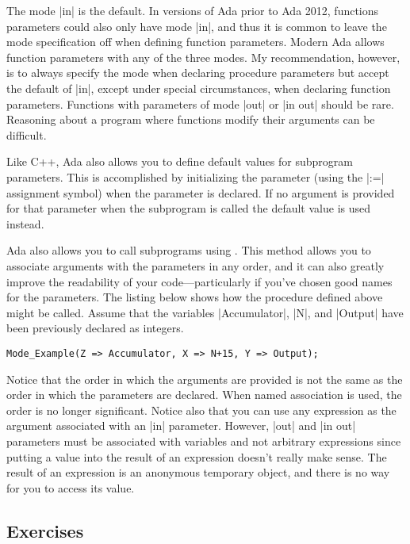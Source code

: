 The mode |in| is the default. In versions of Ada prior to Ada 2012, functions parameters could
also only have mode |in|, and thus it is common to leave the mode specification off when
defining function parameters. Modern Ada allows function parameters with any of the three modes.
My recommendation, however, is to always specify the mode when declaring procedure parameters
but accept the default of |in|, except under special circumstances, when declaring function
parameters. Functions with parameters of mode |out| or |in out| should be rare. Reasoning about
a program where functions modify their arguments can be difficult.

Like C++, Ada also allows you to define default values for subprogram parameters. This is
accomplished by initializing the parameter (using the |:=| assignment symbol) when the parameter
is declared. If no argument is provided for that parameter when the subprogram is called the
default value is used instead.

Ada also allows you to call subprograms using . This
method allows you to associate arguments with the parameters in any order, and it can also
greatly improve the readability of your code---particularly if you've chosen good names for the
parameters. The listing below shows how the procedure defined above might be called. Assume that
the variables |Accumulator|, |N|, and |Output| have been previously declared as integers.

\begin{lstlisting}
Mode_Example(Z => Accumulator, X => N+15, Y => Output);
\end{lstlisting}

\noindent Notice that the order in which the arguments are provided is not the same as the order
in which the parameters are declared. When named association is used, the order is no longer
significant. Notice also that you can use any expression as the argument associated with an |in|
parameter. However, |out| and |in out| parameters must be associated with variables and not
arbitrary expressions since putting a value into the result of an expression doesn't really make
sense. The result of an expression is an anonymous temporary object, and there is no way for you
to access its value.

\subsection*{Exercises}

